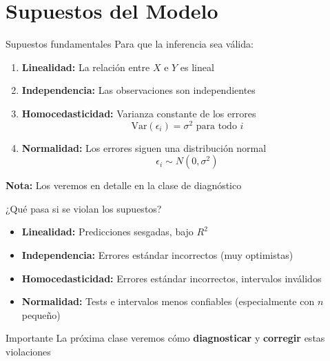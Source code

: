 \documentclass[aspectratio=169]{beamer}
\begin{document}
\section{Supuestos del Modelo}

\begin{frame}{Supuestos fundamentales}
Para que la inferencia sea válida:

\begin{enumerate}
    \item \textbf{Linealidad:} La relación entre $X$ e $Y$ es lineal
    \item \textbf{Independencia:} Las observaciones son independientes
    \item \textbf{Homocedasticidad:} Varianza constante de los errores
    \[
    \text{Var}(\epsilon_i) = \sigma^2 \text{ para todo } i
    \]
    \item \textbf{Normalidad:} Los errores siguen una distribución normal
    \[
    \epsilon_i \sim N(0, \sigma^2)
    \]
\end{enumerate}

\vspace{0.3cm}
\textbf{Nota:} Los veremos en detalle en la clase de diagnóstico
\end{frame}

\begin{frame}{¿Qué pasa si se violan los supuestos?}
\begin{itemize}
    \item \textbf{Linealidad:} Predicciones sesgadas, bajo $R^2$
    \item \textbf{Independencia:} Errores estándar incorrectos (muy optimistas)
    \item \textbf{Homocedasticidad:} Errores estándar incorrectos, intervalos inválidos
    \item \textbf{Normalidad:} Tests e intervalos menos confiables (especialmente con $n$ pequeño)
\end{itemize}

\vspace{0.5cm}
\begin{alertblock}{Importante}
La próxima clase veremos cómo \textbf{diagnosticar} y \textbf{corregir} estas violaciones
\end{alertblock}
\end{frame}

\end{document}
